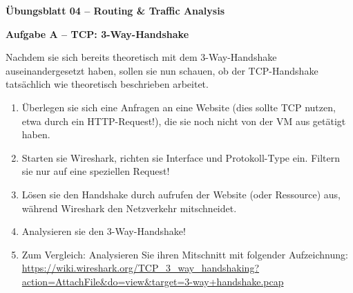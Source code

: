 \documentclass[paper=a4,fontsize=11pt]{scrartcl}%
\begin{document}
\begin{center}
\Large{\textbf{Übungsblatt 04 -- Routing \& Traffic Analysis}}\\
\end{center}

\begin{center}\Large{\textbf{Aufgabe A -- TCP: 3-Way-Handshake}}\end{center}\vskip0.2in
Nachdem sie sich bereits theoretisch mit dem 3-Way-Handshake auseinandergesetzt haben, sollen sie nun schauen, ob der TCP-Handshake tatsächlich wie theoretisch beschrieben arbeitet.
\begin{enumerate}
	\item Überlegen sie sich eine Anfragen an eine Website (dies sollte TCP nutzen, etwa durch ein HTTP-Request!), die sie noch nicht von der VM aus getätigt haben.
	\item Starten sie Wireshark, richten sie Interface und Protokoll-Type ein. Filtern sie nur auf eine speziellen Request!
	\item Lösen sie den Handshake durch aufrufen der Website (oder Ressource) aus, während Wireshark den Netzverkehr mitschneidet.
	\item Analysieren sie den 3-Way-Handshake!
	\item Zum Vergleich: Analysieren Sie ihren Mitschnitt mit folgender Aufzeichnung: \url{https://wiki.wireshark.org/TCP_3_way_handshaking?action=AttachFile&do=view&target=3-way+handshake.pcap}
\end{enumerate}
\end{document}
